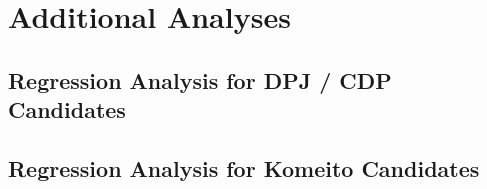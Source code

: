 \documentclass[a4paper, 11pt]{article}
\begin{document}
\newpage

\section{Additional Analyses}

\setcounter{table}{0}
\setcounter{figure}{0}
\renewcommand{\thetable}{B\arabic{table}}
\renewcommand{\thefigure}{B\arabic{figure}}

\subsection{Regression Analysis for DPJ / CDP Candidates}



\newpage

\subsection{Regression Analysis for Komeito Candidates}


\end{document}
